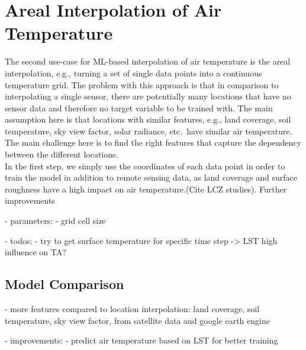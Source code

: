 


\section{Areal Interpolation of Air Temperature}

The second use-case for ML-based interpolation of air temperature is the areal interpolation, e.g., turning a set of single data points into a continuous temperature grid. The problem with this approach is that in comparison to interpolating a single sensor, there are potentially many locations that have no sensor data and therefore no target variable to be trained with. The main assumption here is that locations with similar features, e.g., land coverage, soil temperature, sky view factor, solar radiance, etc.\ have similar air temperature. The main challenge here is to find the right features that capture the dependency between the different locations.\\
In the first step, we simply use the coordinates of each data point in order to train the model in addition to remote sensing data, as land coverage and surface roughness have a high impact on air temperature.(Cite LCZ studies).
Further improvements

- parameters:
  - grid cell size

- todos:
  - try to get surface temperature for specific time step -> LST high influence on TA?

\subsection{Model Comparison}

- more features compared to location interpolation: land coverage, soil temperature, sky view factor, from satellite data and google earth engine

- improvements:
  - predict air temperature based on LST for better training

